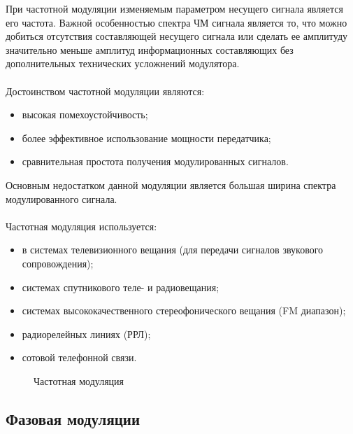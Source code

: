 \documentclass[a4paper,14pt]{extarticle}
\begin{document}
При частотной модуляции изменяемым параметром несущего сигнала является его частота. Важной особенностью спектра ЧМ сигнала является то, что можно добиться отсутствия составляющей несущего сигнала или сделать ее амплитуду значительно меньше амплитуд информационных составляющих без дополнительных технических усложнений модулятора.\\\\
Достоинством частотной модуляции являются:
\begin{itemize}
\item высокая помехоустойчивость;
\item более эффективное использование мощности передатчика;
\item сравнительная простота получения модулированных сигналов.
\end{itemize}
Основным недостатком данной модуляции является большая ширина спектра модулированного сигнала.\\\\
Частотная модуляция используется:
\begin{itemize}
\item в системах телевизионного вещания (для передачи сигналов звукового сопровождения);
\item системах спутникового теле- и радиовещания;
\item системах высококачественного стереофонического вещания (FM диапазон);
\item радиорелейных линиях (РРЛ);
\item сотовой телефонной связи.\\
\end{itemize}

\begin{figure}[H]
\caption{Частотная модуляция}
\end{figure}

\subsection{Фазовая модуляции}
\end{document}
